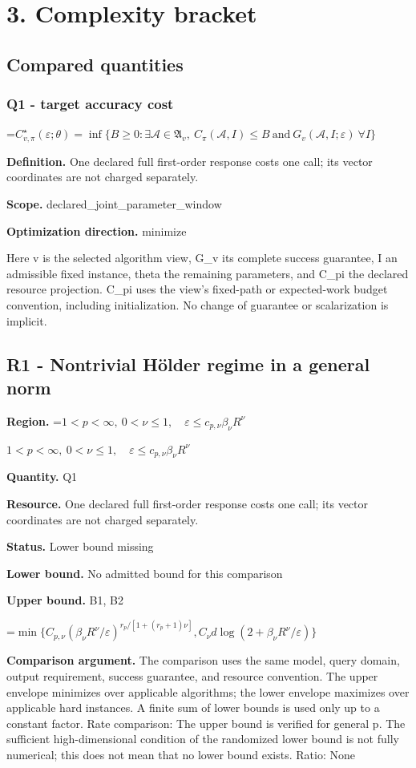 \documentclass[10pt,a4paper]{article}
\newcommand{\AtlasMath}[1]{\par\begingroup\centering\setbox0=\hbox{$\displaystyle #1$}\ifdim\wd0>1.4\linewidth\typeout{ATLAS WIDE FORMULA: \the\wd0}\fi\ifdim\wd0>\linewidth\resizebox{\linewidth}{!}{\box0}\else\box0\fi\par\endgroup}
\newcommand{\AtlasInlineMath}[1]{\begingroup\setbox0=\hbox{$#1$}\ifdim\wd0>.4\linewidth\endgroup\AtlasMath{#1}\else\endgroup$#1$\fi}
\begin{document}
\section{3. Complexity bracket}
\subsection{Compared quantities}
\subsubsection{Q1 - target accuracy cost}
\AtlasMath{C^\star_{v,\pi}(\varepsilon;\theta)=\inf\{B\ge0:\exists\mathcal A\in\mathfrak A_v,\ C_\pi(\mathcal A,I)\le B\ \text{and}\ G_v(\mathcal A,I;\varepsilon)\ \forall I\}}
\textbf{Definition.} One declared full first-order response costs one call; its vector coordinates are not charged separately.

\textbf{Scope.} declared\_joint\_parameter\_window

\textbf{Optimization direction.} minimize

Here v is the selected algorithm view, G\_v its complete success guarantee, I an admissible fixed instance, theta the remaining parameters, and C\_pi the declared resource projection. C\_pi uses the view's fixed-path or expected-work budget convention, including initialization. No change of guarantee or scalarization is implicit.

\subsection{R1 - Nontrivial Hölder regime in a general norm}
\textbf{Region.} \AtlasInlineMath{1<p<\infty,\ 0<\nu\le1,\quad\varepsilon\le c_{p,\nu}\beta_\nu R^\nu}

\textbf{Quantity.} Q1

\textbf{Resource.} One declared full first-order response costs one call; its vector coordinates are not charged separately.

\textbf{Status.} Lower bound missing

\textbf{Lower bound.} No admitted bound for this comparison

\textbf{Upper bound.} B1, B2

\AtlasMath{\min\{C_{p,\nu}(\beta_\nu R^\nu/\varepsilon)^{r_p/[1+(r_p+1)\nu]},C_\nu d\log(2+\beta_\nu R^\nu/\varepsilon)\}}
\textbf{Comparison argument.} The comparison uses the same model, query domain, output requirement, success guarantee, and resource convention. The upper envelope minimizes over applicable algorithms; the lower envelope maximizes over applicable hard instances. A finite sum of lower bounds is used only up to a constant factor. Rate comparison: The upper bound is verified for general p. The sufficient high-dimensional condition of the randomized lower bound is not fully numerical; this does not mean that no lower bound exists. Ratio: None
\end{document}
